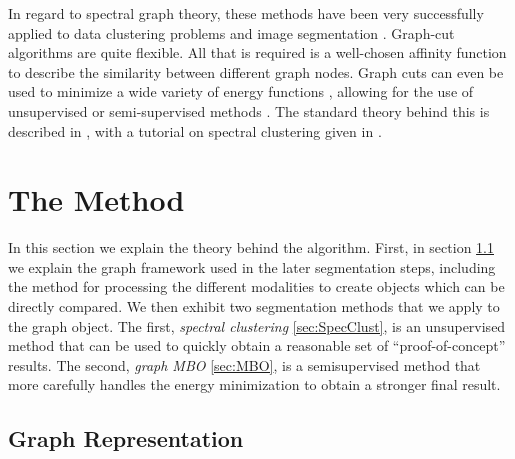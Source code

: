 \documentclass[journal]{IEEEtran}
\begin{document}

In regard to spectral graph theory, these methods have been very successfully
applied to data clustering problems and image segmentation
\cite{1467569,1580491,868688}. Graph-cut algorithms are quite flexible. All that
is required is a well-chosen affinity function to describe the similarity
between different graph nodes. Graph cuts can even be used to minimize a wide
variety of energy functions \cite{1262177}, allowing for the use of unsupervised
\cite{Hu2015,Woodworth13} or semi-supervised methods \cite{Merkurjev13}. The
standard theory behind this is described in \cite{Mohar91}, with a tutorial on
spectral clustering given in \cite{vonLuxburg07}.

\section{The Method}
\label{sec:method}

In this section we explain the theory behind the algorithm. First, in section
\ref{sec:GraphRep} we explain the graph framework used in the later segmentation
steps, including the method for processing the different modalities to create
objects which can be directly compared. We then exhibit two segmentation methods
that we apply to the graph object. The first, \emph{spectral clustering}
\ref{sec:SpecClust}, is an unsupervised method that can be used to quickly
obtain a reasonable set of ``proof-of-concept'' results. The second, \emph{graph
  MBO} \ref{sec:MBO}, is a semisupervised method that more carefully handles the
energy minimization to obtain a stronger final result.

\subsection{Graph Representation} \label{sec:GraphRep}
\end{document}
